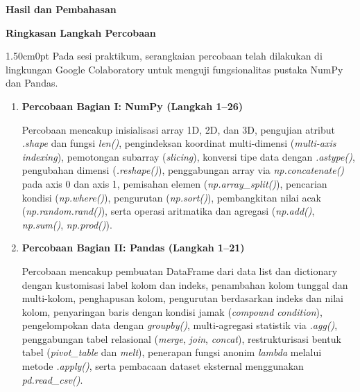 \documentclass[12pt,a4paper]{article}
\begin{document}
\vspace{0.35cm}
{}
\noindent{}\textbf{\normalsize Hasil dan Pembahasan}\par
\vspace{0.15cm}

{}
\noindent\hspace*{0.75cm}\textbf{\normalsize Ringkasan Langkah Percobaan}\par
\vspace{0.12cm}

\begin{adjustwidth}{1.50cm}{0pt}
\hspace*{0.85cm}Pada sesi praktikum, serangkaian percobaan telah dilakukan di lingkungan Google Colaboratory untuk menguji fungsionalitas pustaka NumPy dan Pandas.
\end{adjustwidth}

\begin{enumerate}[label=\alph*., leftmargin=2.25cm, labelwidth=0.75cm, labelsep=0cm, align=left]
    \item \textbf{Percobaan Bagian I: NumPy (Langkah 1--26)}
    
    \hspace*{0.85cm}Percobaan mencakup inisialisasi array 1D, 2D, dan 3D, pengujian atribut \textit{.shape} dan fungsi \textit{len()}, pengindeksan koordinat multi-dimensi (\textit{multi-axis indexing}), pemotongan subarray (\textit{slicing}), konversi tipe data dengan \textit{.astype()}, pengubahan dimensi (\textit{.reshape()}), penggabungan array via \textit{np.concatenate()} pada axis 0 dan axis 1, pemisahan elemen (\textit{np.array\_split()}), pencarian kondisi (\textit{np.where()}), pengurutan (\textit{np.sort()}), pembangkitan nilai acak (\textit{np.random.rand()}), serta operasi aritmatika dan agregasi (\textit{np.add()}, \textit{np.sum()}, \textit{np.prod()}).
    
    \item \textbf{Percobaan Bagian II: Pandas (Langkah 1--21)}
    
    \hspace*{0.85cm}Percobaan mencakup pembuatan DataFrame dari data list dan dictionary dengan kustomisasi label kolom dan indeks, penambahan kolom tunggal dan multi-kolom, penghapusan kolom, pengurutan berdasarkan indeks dan nilai kolom, penyaringan baris dengan kondisi jamak (\textit{compound condition}), pengelompokan data dengan \textit{groupby()}, multi-agregasi statistik via \textit{.agg()}, penggabungan tabel relasional (\textit{merge}, \textit{join}, \textit{concat}), restrukturisasi bentuk tabel (\textit{pivot\_table} dan \textit{melt}), penerapan fungsi anonim \textit{lambda} melalui metode \textit{.apply()}, serta pembacaan dataset eksternal menggunakan \textit{pd.read\_csv()}.
\end{enumerate}
\end{document}
